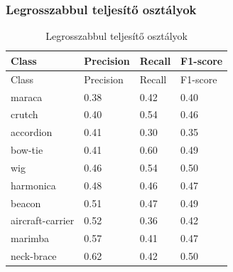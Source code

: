 \subsubsection{Legrosszabbul teljesítő osztályok}
\begin{center}
  \begin{longtable}{llll}
  \caption{Legrosszabbul teljesítő osztályok}\label{tab:phase02_DenseNet121_legrosszabb_osztlyok}\\
  \toprule
  Class & Precision & Recall & F1-score \\
  \midrule
  \endfirsthead
  \toprule
  Class & Precision & Recall & F1-score \\
  \midrule
  \endhead
  maraca & 0.38 & 0.42 & 0.40 \\
  crutch & 0.40 & 0.54 & 0.46 \\
  accordion & 0.41 & 0.30 & 0.35 \\
  bow-tie & 0.41 & 0.60 & 0.49 \\
  wig & 0.46 & 0.54 & 0.50 \\
  harmonica & 0.48 & 0.46 & 0.47 \\
  beacon & 0.51 & 0.47 & 0.49 \\
  aircraft-carrier & 0.52 & 0.36 & 0.42 \\
  marimba & 0.57 & 0.41 & 0.47 \\
  neck-brace & 0.62 & 0.42 & 0.50 \\
  \bottomrule
  \end{longtable}
  \end{center}